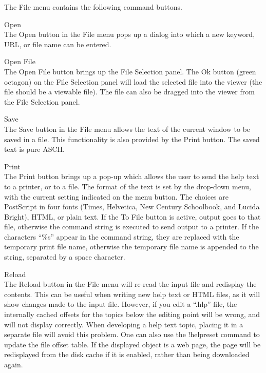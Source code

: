 The {\cb File} menu contains the following command buttons.
\begin{description}
\item{\cb Open}\\
The {\cb Open} button in the {\cb File} menu pops up a dialog into
which a new keyword, URL, or file name can be entered.

\item{\cb Open File}\\
The {\cb Open File} button brings up the {\cb File Selection} panel. 
The {\cb Ok} button (green octagon) on the {\cb File Selection} panel
will load the selected file into the viewer (the file should be a
viewable file).  The file can also be dragged into the viewer from the
{\cb File Selection} panel.

\item{\cb Save}\\
The {\cb Save} button in the {\cb File} menu allows the text of the
current window to be saved in a file.  This functionality is also
provided by the {\cb Print} button.  The saved text is pure ASCII.

\item{\cb Print}\\
The {\cb Print} button brings up a pop-up which allows the user to
send the help text to a printer, or to a file.  The format of the text
is set by the drop-down menu, with the current setting indicated on
the menu button.  The choices are PostScript in four fonts (Times,
Helvetica, New Century Schoolbook, and Lucida Bright), HTML, or plain
text.  If the {\cb To File} button is active, output goes to that
file, otherwise the command string is executed to send output to a
printer.  If the characters ``{\vt \%s}'' appear in the command
string, they are replaced with the temporary print file name,
otherwise the temporary file name is appended to the string, separated
by a space character.

\item{\cb Reload}\\
The {\cb Reload} button in the {\cb File} menu will re-read the input
file and redisplay the contents.  This can be useful when writing new
help text or HTML files, as it will show changes made to the input
file.  However, if you edit a ``{\vt .hlp}'' file, the internally
cached offsets for the topics below the editing point will be wrong,
and will not display correctly.  When developing a help text topic,
placing it in a separate file will avoid this problem.  One can also
use the {\cb !helpreset} command to update the file offset table.  If
the displayed object is a web page, the page will be redisplayed from
the disk cache if it is enabled, rather than being downloaded again.


\end{description}
